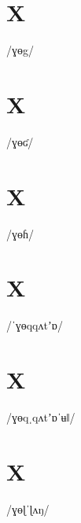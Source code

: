 \documentclass[10pt,a4paper,twoside]{book}
\begin{document}
\section*{X}

\begin{multicols}{3}
 {/ɣɵg/} {}
\end{multicols}

\section*{X}

\begin{multicols}{3}
 {/ɣɵʛ/} {}
\end{multicols}

\section*{X}

\begin{multicols}{3}
 {/ɣɵɦ/} {}
\end{multicols}

\section*{X}

\begin{multicols}{3}
 {/ˈɣɵqqʌtʼɒ/} {}
\end{multicols}

\section*{X}

\begin{multicols}{3}
 {/ɣɵqˌqʌtʼɒˈʉǁ/} {}
\end{multicols}

\section*{X}

\begin{multicols}{3}
 {/ɣɵɭˈɭʌŋ/} {}
\end{multicols}
\end{document}
